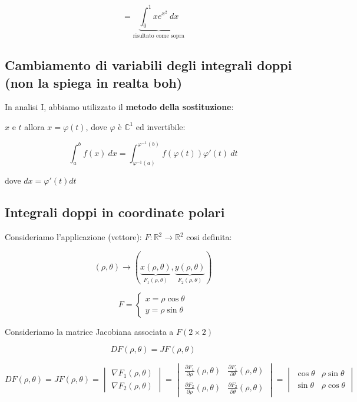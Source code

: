 \documentclass[../appunti-analisi.tex]{subfiles}
\begin{document}
\[
    = \underbrace{\int_{0}^{1} {x e^{x^{2}}} \: dx }_\text{risultato come sopra}
\]

\subsection{Cambiamento di variabili degli integrali doppi (non la spiega in realta boh)}

In analisi I, abbiamo utilizzato il \textbf{metodo della sostituzione}:

$x$ e $t$ allora $x=\varphi(t)$, dove $\varphi$ è $\mathbb{C}^{1}$ ed invertibile:

\[
    \int_{a}^{b} {f(x)} \: dx = \int_{\varphi^{-1}(a)}^{\varphi^{-1}(b)} {f(\varphi(t))\varphi'(t)} \: dt 
\]

dove $d x = \varphi'(t) dt$


\subsection{Integrali doppi in coordinate polari}

Consideriamo l'applicazione (vettore): $F: \mathbb{R}^{2} \rightarrow \mathbb{R}^2$ cosi definita:

\[
    (\rho, \theta) \rightarrow (\underbrace{x(\rho, \theta)}_\text{$F_1(\rho, \theta)$}, \underbrace{y(\rho, \theta)}_\text{$F_2(\rho,\theta)$})
\]

\[
    F = \begin{cases}
        x=\rho \cos \theta\\
         y = \rho \sin \theta
    \end{cases}
\]


Consideriamo la matrice Jacobiana associata a $F(2\times 2 )$

\[
    DF(\rho,\theta) = JF(\rho,\theta)
\]

\[
    DF(\rho,\theta) = JF(\rho,\theta) = \begin{vmatrix}
    \nabla F_1(\rho,\theta)\\
     \nabla F_2(\rho,\theta)
    \end{vmatrix} = \begin{vmatrix}
    \frac{\partial F_1}{\partial \rho}(\rho,\theta) & \frac{\partial F_1}{\partial \theta}(\rho,\theta)\\
    \frac{\partial F_2}{\partial \rho}(\rho,\theta) & \frac{\partial F_2}{\partial \theta}(\rho,\theta)
    \end{vmatrix} = \begin{vmatrix}
    \cos \theta & \rho \sin \theta\\
    \sin \theta & \rho \cos \theta 
    \end{vmatrix}
\]
\end{document}
